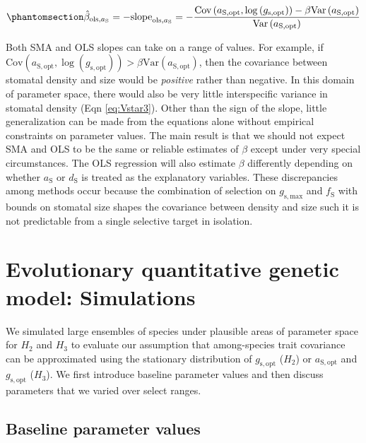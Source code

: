 \documentclass[
  letterpaper,
  DIV=11,
  numbers=noendperiod]{scrartcl}
\begin{document}
\begin{equation}\phantomsection\label{eq-est-ols23}{\hat{\beta}_{\text{ols},a_\mathrm{S}} = -\text{slope}_{\text{ols},a_\mathrm{S}} =-\frac{\text{Cov} \left(a_\mathrm{S,opt}, \log \left(g_\mathrm{s,opt} \right) \right) - \beta \text{Var} \left( a_\mathrm{S,opt} \right)}{\text{Var} \left( a_{\mathrm{S,opt}}\right)}}\end{equation}

Both SMA and OLS slopes can take on a range of values. For example, if
\(\text{Cov} \left( a_\mathrm{S,opt}, \log \left( g_\mathrm{s,opt} \right) \right) > \beta \text{Var} \left(a_\mathrm{S,opt} \right)\),
then the covariance between stomatal density and size would be
\emph{positive} rather than negative. In this domain of parameter space,
there would also be very little interspecific variance in stomatal
density (Eqn \ref{eq:Vstar3}). Other than the sign of the slope, little
generalization can be made from the equations alone without empirical
constraints on parameter values. The main result is that we should not
expect SMA and OLS to be the same or reliable estimates of \(\beta\)
except under very special circumstances. The OLS regression will also
estimate \(\beta\) differently depending on whether \(a_\mathrm{S}\) or
\(d_\mathrm{S}\) is treated as the explanatory variables. These
discrepancies among methods occur because the combination of selection
on \(g_\mathrm{s,max}\) and \(f_\mathrm{S}\) with bounds on stomatal
size shapes the covariance between density and size such it is not
predictable from a single selective target in isolation.

\newpage

\section{Evolutionary quantitative genetic model:
Simulations}\label{sec-simulations}

We simulated large ensembles of species under plausible areas of
parameter space for \(H_2\) and \(H_3\) to evaluate our assumption that
among-species trait covariance can be approximated using the stationary
distribution of \(g_\mathrm{s,opt}\) (\(H_2\)) or \(a_\mathrm{S,opt}\)
and \(g_\mathrm{s,opt}\) (\(H_3\)). We first introduce baseline
parameter values and then discuss parameters that we varied over select
ranges.

\subsection{Baseline parameter values}\label{baseline-parameter-values}
\end{document}
